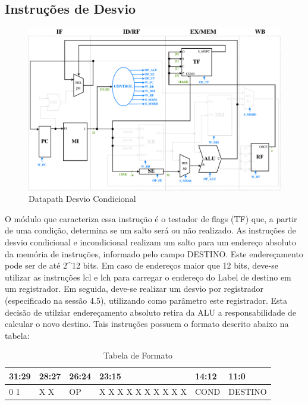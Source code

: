 \documentclass{report}
\begin{document}
\subsection{Instruções de Desvio}
\begin{figure}[H]
\centering
\includegraphics[width=\textwidth]{./pictures/DatapathDES.pdf}
\caption{Datapath Desvio Condicional}
\end{figure}

O módulo que caracteriza essa instrução é o testador de flags (TF) que, a partir de uma condição, determina se um salto será ou não realizado.
As instruções de desvio condicional e incondicional realizam um salto para um endereço absoluto da memória de instruções, informado pelo campo DESTINO. Este endereçamento pode ser de até 2\^{}12 bits. Em caso de endereços maior que 12 bits, deve-se utilizar as instruções lcl e lch para carregar o endereço do Label de destino em um registrador. Em seguida, deve-se realizar um desvio por registrador (especificado na sessão 4.5), utilizando como parâmetro este registrador.
Esta decisão de utilziar endereçamento absoluto retira da ALU a responsabilidade de calcular o novo destino.
\newline
Tais instruções possuem o formato descrito abaixo na tabela:
\FloatBarrier
\begin{table}[H]
  \begin{center}
    \begin{tabular}[pos]{|>{\centering\arraybackslash}m{33pt}|>{\centering\arraybackslash}m{28pt}|>{\centering\arraybackslash}m{33pt}|>{\centering\arraybackslash}m{105pt}|>{\centering\arraybackslash}m{33pt}|>{\centering\arraybackslash}m{120pt}|} \hline
      \cellcolor[gray]{0.9}\textbf{31:29} & \cellcolor[gray]{0.9}\textbf{28:27} & \cellcolor[gray]{0.9}\textbf{26:24} & \cellcolor[gray]{0.9}\textbf{23:15} & \cellcolor[gray]{0.9}\textbf{14:12} & \cellcolor[gray]{0.9}\textbf{11:0} \\ \hline
        1 0 1       & X X       & OP        & X X X X X X X X X X      & COND       & DESTINO \\ \hline
    \end{tabular}
    \caption{Tabela de Formato}
  \end{center}
\end{table}  
\end{document}
